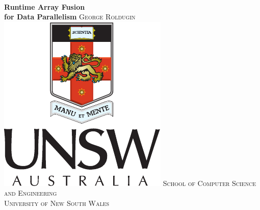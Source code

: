 \documentclass[preamble.tex]{subfiles}
\begin{document}
\begin{titlepage}
    \centering
    ~\\
    \vskip3cm
    \Huge\textbf{Runtime Array Fusion\\for Data Parallelism} 
    \vskip2cm
    \Large\textsc{George Roldugin}
    \vfill
    \vfill
    \includegraphics[]{img/UNSW-Portrait-Colour}
    \vfill
    \Large\textsc{
        School of Computer Science and Engineering\\
        University of New South Wales
    }
    \vfill
    \vfill
\end{titlepage}

\end{document}

